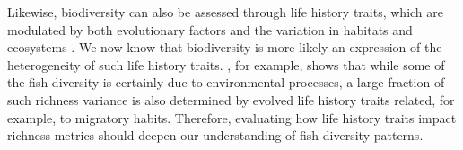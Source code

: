 \documentclass[12pt,authoryear]{elsarticle}
\providecommand{\DIFaddbegin}{} %
\providecommand{\DIFaddend}{} %
\begin{document}
\DIFaddbegin 

\DIFaddend Likewise, biodiversity can also be assessed through life history traits, which are modulated by both evolutionary factors and the variation in habitats and ecosystems \citep{neigel_book_1997, hutchings2005measuring}. We now know that biodiversity is more likely an expression of the heterogeneity of such life history traits. \citealt{alo2021macroecology}, for example, shows that while some of the fish diversity is certainly due to environmental processes, a large fraction of such richness variance is also determined by evolved life history traits related, for example, to migratory habits. Therefore, evaluating how life history traits impact richness metrics should deepen our understanding of fish diversity patterns.
\end{document}

